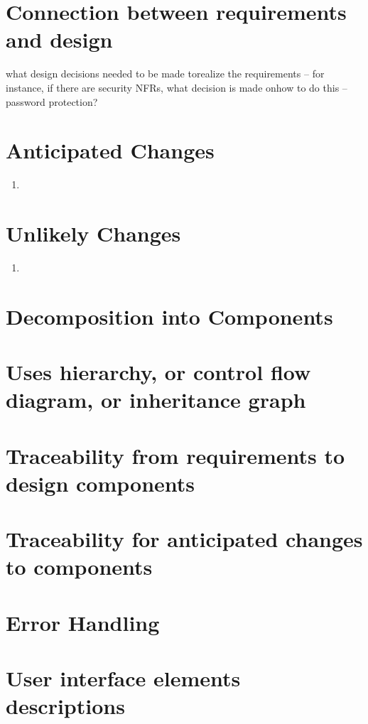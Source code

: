 \documentclass[12pt]{article}
\begin{document}
\section{Connection between requirements and design}
what design decisions needed to be made torealize the requirements – for instance, if there are security NFRs, what decision is made onhow to do this – password protection?

\section{Anticipated Changes}
\begin{enumerate}
\item{}
\end{enumerate}

\section{Unlikely Changes}
\begin{enumerate}
\item{}
\end{enumerate}

%
\section{Decomposition into Components}

%
\section{Uses hierarchy, or control flow diagram, or inheritance graph}

%
\section{Traceability from requirements to design components}

%
\section{Traceability for anticipated changes to components}

%
\section{Error Handling}

%
\section{User interface elements descriptions}
\end{document}
